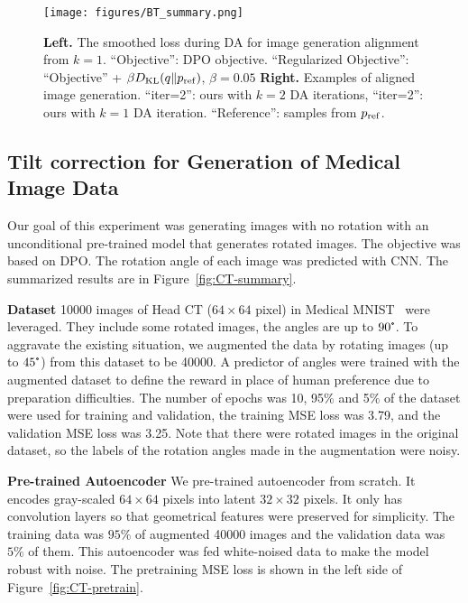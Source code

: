 \begin{figure}[h]
    \centering
    \texttt{[image: figures/BT\_summary.png]}
    \caption{\textbf{Left. }The smoothed loss during DA for image generation alignment from $k=1$. ``Objective'': DPO objective.
        ``Regularized Objective'': ``Objective'' + $\beta D_{\mathrm{KL}}(q\|p_{\rm{ref}})$, $\beta=0.05$
    \textbf{Right.} Examples of aligned image generation. ``iter=2'': ours with $k=2$ DA iterations, ``iter=2'': ours with $k=1$ DA iteration. ``Reference'': samples from $p_{\rm{ref}}$.}
    \label{fig:BT-summary}
\end{figure}

\subsection{Tilt correction for Generation of Medical Image Data}

Our goal of this experiment was generating images with no rotation with an unconditional pre-trained model that generates rotated images. The objective was based on DPO. The rotation angle of each image was predicted with CNN.
The summarized results are in Figure~\ref{fig:CT-summary}.

\textbf{Dataset}
 10000 images of Head CT ($64 \times 64$ pixel) in Medical MNIST~\cite{MedicalMNISTClassification} were leveraged. They include some rotated images, the angles are up to $90\tcdegree$. To aggravate the existing situation, we augmented the data by rotating images (up to $45\tcdegree$) from this dataset to be 40000. A predictor of angles were trained with the augmented dataset to define the reward in place of human preference due to preparation difficulties. The number of epochs was 10, 95\% and 5\% of the dataset were used for training and validation, the training MSE loss was 3.79, and the validation MSE loss was 3.25.  Note that there were rotated images in the original dataset, so the labels of the rotation angles made in the augmentation were noisy.

\textbf{Pre-trained Autoencoder}
We pre-trained autoencoder from scratch. It encodes gray-scaled $64\times64$ pixels into latent $32\times 32$ pixels. It only has convolution layers so that geometrical features were preserved for simplicity. The training data was $95\%$ of augmented 40000 images and the validation data was $5\%$ of them. This autoencoder was fed white-noised data to make the model robust with noise. The pretraining MSE loss is shown in the left side of Figure~\ref{fig:CT-pretrain}.
